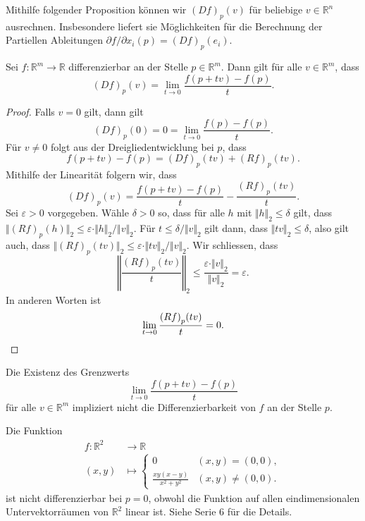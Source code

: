 \documentclass[../main.tex]{subfiles}
\begin{document}
Mithilfe folgender Proposition können wir ${(Df)}_p(v)$
für beliebige $v \in \mathbb{R}^n$ ausrechnen.
Insbesondere liefert sie Möglichkeiten für die
Berechnung der Partiellen Ableitungen
$\partial f / \partial x_i (p) = {(Df)}_p(e_i)$.

\begin{proposition*}
  Sei $f \colon \mathbb{R}^m \to \mathbb{R}$ differenzierbar
  an der Stelle $p \in \mathbb{R}^m$.
  Dann gilt für alle $v \in \mathbb{R}^m$, dass
  \[
    {(Df)}_p(v) = \lim_{t \to 0}
    \frac{f(p + tv) - f(p)}{t}.
  \]
\end{proposition*}

\begin{proof}
  Falls $v = 0$ gilt, dann gilt
  \[
    {(Df)}_p(0) = 0 = \lim_{t \to 0} \frac{f(p) - f(p)}{t}.
  \]
  Für $v \neq 0$ folgt aus der Dreigliedentwicklung
  bei $p$, dass
  \[
    f(p + tv) - f(p)
    = {(Df)}_p(tv) + {(Rf)}_p(tv).
  \]
  Mithilfe der Linearität folgern wir, dass
  \[
    {(Df)}_p(v) = \frac{f(p + tv) - f(p)}{t} - \frac{{(Rf)}_p(tv)}{t}.
  \]
  Sei $\varepsilon > 0$ vorgegeben. Wähle $\delta > 0$
  so, dass für alle $h$ mit $\Vert h \Vert_2 \leq \delta$
  gilt, dass $\Vert {(Rf)}_p(h) \Vert_2 \leq \varepsilon \cdot
  \Vert h \Vert_2 / \Vert v \Vert_2$.
  Für $t \leq \delta / \Vert v \Vert_2$ gilt dann,
  dass $\Vert tv \Vert_2 \leq \delta$,
  also gilt auch, dass
  $\Vert {(Rf)}_p (tv) \Vert_2 \leq \varepsilon
  \cdot \Vert t v \Vert_2 /\Vert v \Vert_2$.
  Wir schliessen, dass
  \[
    \left\Vert \frac{{(Rf)}_p(tv)}{t} \right\Vert_2
    \leq \frac{\varepsilon \cdot \Vert v \Vert_2}{\Vert v \Vert_2}
    = \varepsilon.
  \]
  In anderen Worten ist
  \[
    \lim_{t \to 0} \frac{{(Rf)}_p(tv)}{t} = 0. \qedhere
  \]
\end{proof}

\begin{remark}
  Die Existenz des Grenzwerts
  \[
    \lim_{t \to 0} \frac{f(p + tv) - f(p)}{t}
  \]
  für alle $v \in \mathbb{R}^m$ impliziert nicht
  die Differenzierbarkeit von $f$ an der Stelle $p$.
\end{remark}

\begin{example}
  Die Funktion
  \begin{align*}
    f \colon \mathbb{R}^2 & \to \mathbb{R} \\
    (x, y) & \mapsto
    \begin{cases}
      0 & (x,y) = (0,0), \\
      \frac{xy(x-y)}{x^2 + y^2} & (x,y) \neq (0,0).
    \end{cases}
  \end{align*}
  ist nicht differenzierbar bei $p = 0$,
  obwohl die Funktion auf allen eindimensionalen Untervektorräumen
  von $\mathbb{R}^2$ linear ist.
  Siehe Serie 6 für die Details.
\end{example}
\end{document}

